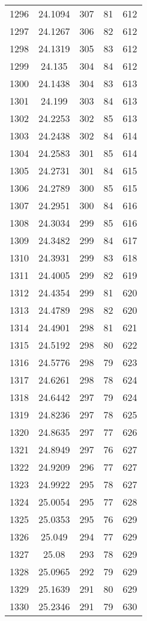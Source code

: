 \documentclass[12pt,a4paper]{article}
\begin{document}
\begin{tabular}{r|cccc}
	1296 & 24.1094 & 307 & 81 & 612 \\
	1297 & 24.1267 & 306 & 82 & 612 \\
	1298 & 24.1319 & 305 & 83 & 612 \\
	1299 & 24.135 & 304 & 84 & 612 \\
	1300 & 24.1438 & 304 & 83 & 613 \\
	1301 & 24.199 & 303 & 84 & 613 \\
	1302 & 24.2253 & 302 & 85 & 613 \\
	1303 & 24.2438 & 302 & 84 & 614 \\
	1304 & 24.2583 & 301 & 85 & 614 \\
	1305 & 24.2731 & 301 & 84 & 615 \\
	1306 & 24.2789 & 300 & 85 & 615 \\
	1307 & 24.2951 & 300 & 84 & 616 \\
	1308 & 24.3034 & 299 & 85 & 616 \\
	1309 & 24.3482 & 299 & 84 & 617 \\
	1310 & 24.3931 & 299 & 83 & 618 \\
	1311 & 24.4005 & 299 & 82 & 619 \\
	1312 & 24.4354 & 299 & 81 & 620 \\
	1313 & 24.4789 & 298 & 82 & 620 \\
	1314 & 24.4901 & 298 & 81 & 621 \\
	1315 & 24.5192 & 298 & 80 & 622 \\
	1316 & 24.5776 & 298 & 79 & 623 \\
	1317 & 24.6261 & 298 & 78 & 624 \\
	1318 & 24.6442 & 297 & 79 & 624 \\
	1319 & 24.8236 & 297 & 78 & 625 \\
	1320 & 24.8635 & 297 & 77 & 626 \\
	1321 & 24.8949 & 297 & 76 & 627 \\
	1322 & 24.9209 & 296 & 77 & 627 \\
	1323 & 24.9922 & 295 & 78 & 627 \\
	1324 & 25.0054 & 295 & 77 & 628 \\
	1325 & 25.0353 & 295 & 76 & 629 \\
	1326 & 25.049 & 294 & 77 & 629 \\
	1327 & 25.08 & 293 & 78 & 629 \\
	1328 & 25.0965 & 292 & 79 & 629 \\
	1329 & 25.1639 & 291 & 80 & 629 \\
	1330 & 25.2346 & 291 & 79 & 630 \\

\end{tabular}
\end{document}
